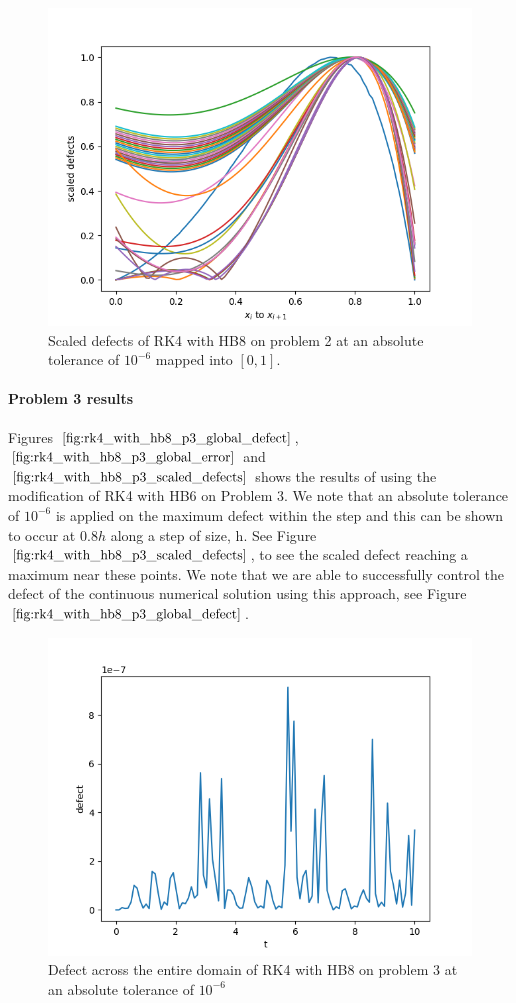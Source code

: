 \documentclass{article}
\begin{document}
\begin{figure}[H]
\centering
\includegraphics[width=0.7\linewidth]{./figures/rk4_with_hb8_p2_scaled_defects}
\caption{Scaled defects of RK4 with HB8 on problem 2 at an absolute tolerance of $10^{-6}$ mapped into $[0, 1]$.}
\label{fig:rk4_with_hb8_p2_scaled_defects}
\end{figure}

\paragraph{Problem 3 results}
Figures $\ref{fig:rk4_with_hb8_p3_global_defect}$, $\ref{fig:rk4_with_hb8_p3_global_error}$ and $\ref{fig:rk4_with_hb8_p3_scaled_defects}$ shows the results of using the modification of RK4 with HB6 on Problem 3. 
We note that an absolute tolerance of $10^{-6}$ is applied on the maximum defect within the step and this can be shown to occur at $0.8h$ along a step of size, h.  See Figure $\ref{fig:rk4_with_hb8_p3_scaled_defects}$, to see the scaled defect reaching a maximum near these points. We note that we are able to successfully control the defect of the continuous numerical solution using this approach, see Figure $\ref{fig:rk4_with_hb8_p3_global_defect}$. 

\begin{figure}[H]
\centering
\includegraphics[width=0.7\linewidth]{./figures/rk4_with_hb8_p3_global_defect}
\caption{Defect across the entire domain of RK4 with HB8 on problem 3 at an absolute tolerance of $10^{-6}$}
\label{fig:rk4_with_hb8_p3_global_defect}
\end{figure}
\end{document}
